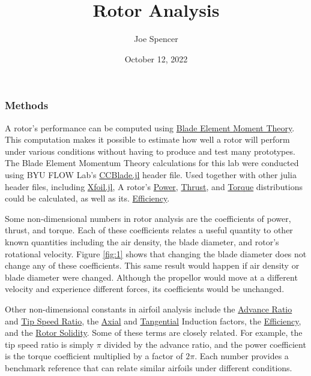 \documentclass{article}
\begin{document}
\author{Joe Spencer}
\title{Rotor Analysis}
\date{October 12, 2022}
\maketitle

\subsubsection*{Methods}

A rotor's performance can be computed using  \hyperlink{BEM}{Blade Element Moment Theory}. This computation makes it possible to estimate how well a rotor will perform under various conditions without having to produce and test many prototypes. The Blade Element Momentum Theory calculations for this lab were conducted using BYU FLOW Lab's \href{https://flow.byu.edu/CCBlade.jl/stable/}{CCBlade.jl} header file. Used together with other julia header files, including \href{https://flow.byu.edu/Xfoil.jl/dev/}{Xfoil.jl}, A rotor's \hyperlink{CP}{Power}, \hyperlink{CT}{Thrust}, and \hyperlink{CQ}{Torque} distributions could be calculated, as well as its. \hyperlink{eta}{Efficiency}. \newline

Some non-dimensional numbers in rotor analysis are the coefficients of power, thrust, and torque. Each of these coefficients relates a useful quantity to other known quantities including the air density, the blade diameter, and rotor's rotational velocity. Figure \ref{fig:1} shows that changing the blade diameter does not change any of these coefficients. This same result would happen if air density or blade diameter were changed. Although the propellor would move at a different velocity and experience different forces, its coefficients would be unchanged. \newline

Other non-dimensional constants in airfoil analysis include the \hyperlink{J}{Advance Ratio} and \hyperlink{lambda}{Tip Speed Ratio}, the \hyperlink{a}{Axial} and \hyperlink{a'}{Tangential} Induction factors, the \hyperlink{eta}{Efficiency}, and the \hyperlink{sigma}{Rotor Solidity}. Some of these terms are closely related. For example, the tip speed ratio is simply $\pi$ divided by the advance ratio, and the power coefficient is the torque coefficient multiplied by a factor of $2 \pi$. Each number provides a benchmark reference that can relate similar airfoils under different conditions. \newline 
\end{document}
